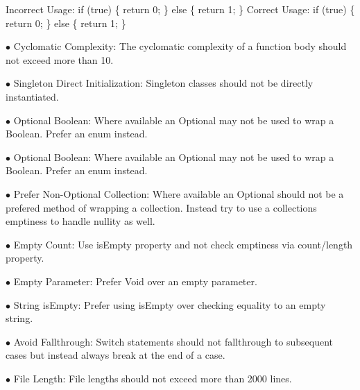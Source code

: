 \documentclass[12pt]{article}
\newcommand\tab[1][0.5cm]{\hspace*{#1}}
\begin{document}
Incorrect Usage:\newline 
  if (true) \{ return 0; \} else \{ return 1; \}\newline 
  Correct Usage:\newline 
  if (true) \{\newline 
   \tab return 0;\newline 
  \} else \{\newline 
   \tab return 1;\newline 
  \}\newline 
  \item[$\bullet$]Cyclomatic Complexity: \newline The cyclomatic complexity of a function body should not exceed more than 10.
  \item[$\bullet$]Singleton Direct Initialization: \newline Singleton classes should not be directly instantiated.
  \item[$\bullet$]Optional Boolean: \newline Where available an Optional may not be used to wrap a Boolean. Prefer an enum instead.
  \item[$\bullet$]Optional Boolean: \newline Where available an Optional may not be used to wrap a Boolean. Prefer an enum instead.
  \item[$\bullet$]Prefer Non-Optional Collection: \newline  Where available an Optional should not be a prefered method of wrapping a collection. Instead try to
  use a collections emptiness to handle nullity as well.
  \item[$\bullet$]Empty Count: \newline Use isEmpty property and not check emptiness via count/length property.
  \item[$\bullet$]Empty Parameter: \newline Prefer Void over an empty parameter.
  \item[$\bullet$]String isEmpty: \newline Prefer using isEmpty over checking equality to an empty string.
  \item[$\bullet$]Avoid Fallthrough: \newline Switch statements should not fallthrough to subsequent cases but instead always break at the end of 
  a case.
  \item[$\bullet$]File Length: \newline File lengths should not exceed more than 2000 lines.
\end{document}
